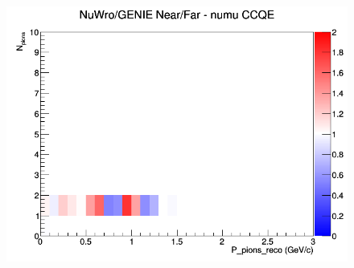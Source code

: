 \documentclass[12pt]{article}
\begin{document}
\begin{figure}[h]
\endminipage
{}
\includegraphics[width=\linewidth]{eff_N_P/LAr/pions/ratios/CCQE_NuWro_GENIE_numu_NF_N_P.png}
\endminipage
\newline
\end{figure}
\clearpage
\end{document}
